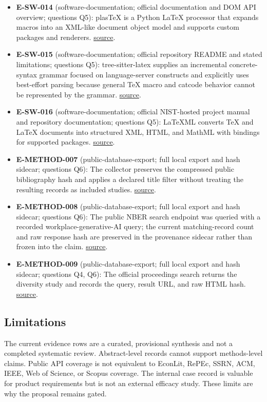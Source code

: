 \documentclass[11pt]{article}
\begin{document}
\begin{itemize}
\item
  \textbf{E-SW-014} (software-documentation; official documentation and DOM API overview; questions Q5): plasTeX is a Python LaTeX processor that expands macros into an XML-like document object model and supports custom packages and renderers. \href{https://plastex.github.io/plastex/}{source}.
\item
  \textbf{E-SW-015} (software-documentation; official repository README and stated limitations; questions Q5): tree-sitter-latex supplies an incremental concrete-syntax grammar focused on language-server constructs and explicitly uses best-effort parsing because general TeX macro and catcode behavior cannot be represented by the grammar. \href{https://github.com/latex-lsp/tree-sitter-latex}{source}.
\item
  \textbf{E-SW-016} (software-documentation; official NIST-hosted project manual and repository documentation; questions Q5): LaTeXML converts TeX and LaTeX documents into structured XML, HTML, and MathML with bindings for supported packages. \href{https://dlmf.nist.gov/LaTeXML/}{source}.
\item
  \textbf{E-METHOD-007} (public-database-export; full local export and hash sidecar; questions Q6): The collector preserves the compressed public bibliography hash and applies a declared title filter without treating the resulting records as included studies. \href{https://aclanthology.org/anthology.bib.gz}{source}.
\item
  \textbf{E-METHOD-008} (public-database-export; full local export and hash sidecar; questions Q6): The public NBER search endpoint was queried with a recorded workplace-generative-AI query; the current matching-record count and raw response hash are preserved in the provenance sidecar rather than frozen into the claim. \href{https://www.nber.org/api/v1/search}{source}.
\item
  \textbf{E-METHOD-009} (public-database-export; full local export and hash sidecar; questions Q4, Q6): The official proceedings search returns the diversity study and records the query, result URL, and raw HTML hash. \href{https://proceedings.iclr.cc/papers/search?q=writing+language+models}{source}.
\end{itemize}

\hypertarget{limitations}{%
\subsection{Limitations}\label{limitations}}

The current evidence rows are a curated, provisional synthesis and not a completed systematic review. Abstract-level records cannot support methods-level claims. Public API coverage is not equivalent to EconLit, RePEc, SSRN, ACM, IEEE, Web of Science, or Scopus coverage. The internal case record is valuable for product requirements but is not an external efficacy study. These limits are why the proposal remains gated.
\end{document}
